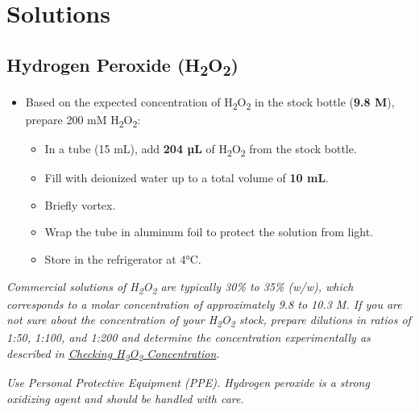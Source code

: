 \documentclass[
  9pt,
  american,
  a5paper,
  extrafontsizes,onecolumn,openright
  ]{memoir}
\providecommand{\tightlist}{%
  \setlength{\itemsep}{0pt}\setlength{\parskip}{0pt}}
\begin{document}
\section{Solutions}\label{solutions}

\subsection{\texorpdfstring{Hydrogen Peroxide (H\textsubscript{2}O\textsubscript{2})}{Hydrogen Peroxide (H2O2)}}\label{hydrogen-peroxide-h2o2}

\begin{itemize}
\tightlist
\item
  Based on the expected concentration of H\textsubscript{2}O\textsubscript{2} in the stock bottle (\textbf{9.8 M}), prepare 200 mM H\textsubscript{2}O\textsubscript{2}:

  \begin{itemize}
  \tightlist
  \item
    In a tube (15 mL), add \textbf{204 µL} of H\textsubscript{2}O\textsubscript{2} from the stock bottle.
  \item
    Fill with deionized water up to a total volume of \textbf{10 mL}.
  \item
    Briefly vortex.
  \item
    Wrap the tube in aluminum foil to protect the solution from light.
  \item
    Store in the refrigerator at 4°C.
  \end{itemize}
\end{itemize}

\begin{greybox}[frametitle = Notes]
\emph{Commercial solutions of H\textsubscript{2}O\textsubscript{2} are typically 30\% to 35\% (w/w), which corresponds to a molar concentration of approximately 9.8 to 10.3 M. If you are not sure about the concentration of your H\textsubscript{2}O\textsubscript{2} stock, prepare dilutions in ratios of 1:50, 1:100, and 1:200 and determine the concentration experimentally as described in \hyperref[cat_checking_h2o2]{Checking H\textsubscript{2}O\textsubscript{2} Concentration}.}

\end{greybox}

\begin{greybox}[frametitle = CAUTION]
\emph{Use Personal Protective Equipment (PPE). Hydrogen peroxide is a strong oxidizing agent and should be handled with care.}

\end{greybox}
\end{document}
